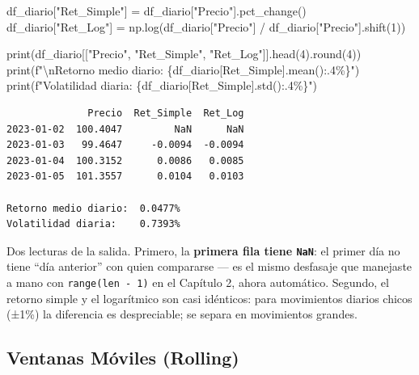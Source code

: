 \documentclass[
  spanish,
  letterpaper,
  DIV=11,
  numbers=noendperiod]{scrreprt}
\newenvironment{Shaded}{\begin{snugshade}}{\end{snugshade}}
\newcommand{\BuiltInTok}[1]{\textcolor[rgb]{0.00,0.23,0.31}{#1}}
\newcommand{\CharTok}[1]{\textcolor[rgb]{0.13,0.47,0.30}{#1}}
\newcommand{\DecValTok}[1]{\textcolor[rgb]{0.68,0.00,0.00}{#1}}
\newcommand{\NormalTok}[1]{\textcolor[rgb]{0.00,0.23,0.31}{#1}}
\newcommand{\OperatorTok}[1]{\textcolor[rgb]{0.37,0.37,0.37}{#1}}
\newcommand{\SpecialCharTok}[1]{\textcolor[rgb]{0.37,0.37,0.37}{#1}}
\newcommand{\SpecialStringTok}[1]{\textcolor[rgb]{0.13,0.47,0.30}{#1}}
\newcommand{\StringTok}[1]{\textcolor[rgb]{0.13,0.47,0.30}{#1}}
\begin{document}
\label{retornos-calculo}
\begin{Shaded}
\begin{Highlighting}[]
\NormalTok{df\_diario[}\StringTok{"Ret\_Simple"}\NormalTok{] }\OperatorTok{=}\NormalTok{ df\_diario[}\StringTok{"Precio"}\NormalTok{].pct\_change()}
\NormalTok{df\_diario[}\StringTok{"Ret\_Log"}\NormalTok{] }\OperatorTok{=}\NormalTok{ np.log(df\_diario[}\StringTok{"Precio"}\NormalTok{] }\OperatorTok{/}\NormalTok{ df\_diario[}\StringTok{"Precio"}\NormalTok{].shift(}\DecValTok{1}\NormalTok{))}

\BuiltInTok{print}\NormalTok{(df\_diario[[}\StringTok{"Precio"}\NormalTok{, }\StringTok{"Ret\_Simple"}\NormalTok{, }\StringTok{"Ret\_Log"}\NormalTok{]].head(}\DecValTok{4}\NormalTok{).}\BuiltInTok{round}\NormalTok{(}\DecValTok{4}\NormalTok{))}
\BuiltInTok{print}\NormalTok{(}\SpecialStringTok{f"}\CharTok{\textbackslash{}n}\SpecialStringTok{Retorno medio diario:  }\SpecialCharTok{\{}\NormalTok{df\_diario[}\StringTok{\textquotesingle{}Ret\_Simple\textquotesingle{}}\NormalTok{]}\SpecialCharTok{.}\NormalTok{mean()}\SpecialCharTok{:.4\%\}}\SpecialStringTok{"}\NormalTok{)}
\BuiltInTok{print}\NormalTok{(}\SpecialStringTok{f"Volatilidad diaria:    }\SpecialCharTok{\{}\NormalTok{df\_diario[}\StringTok{\textquotesingle{}Ret\_Simple\textquotesingle{}}\NormalTok{]}\SpecialCharTok{.}\NormalTok{std()}\SpecialCharTok{:.4\%\}}\SpecialStringTok{"}\NormalTok{)}
\end{Highlighting}
\end{Shaded}

\begin{verbatim}
              Precio  Ret_Simple  Ret_Log
2023-01-02  100.4047         NaN      NaN
2023-01-03   99.4647     -0.0094  -0.0094
2023-01-04  100.3152      0.0086   0.0085
2023-01-05  101.3557      0.0104   0.0103

Retorno medio diario:  0.0477%
Volatilidad diaria:    0.7393%
\end{verbatim}

Dos lecturas de la salida. Primero, la \textbf{primera fila tiene
\texttt{NaN}}: el primer día no tiene ``día anterior'' con quien
compararse --- es el mismo desfasaje que manejaste a mano con
\texttt{range(len\ -\ 1)} en el Capítulo 2, ahora automático. Segundo,
el retorno simple y el logarítmico son casi idénticos: para movimientos
diarios chicos (±1\%) la diferencia es despreciable; se separa en
movimientos grandes.

\subsection{Ventanas Móviles
(Rolling)}\label{ventanas-muxf3viles-rolling}
\end{document}
